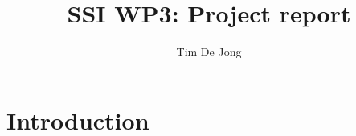 \documentclass{article}
\title{SSI WP3: Project report}
\author{Tim De Jong}
\begin{document}
\maketitle


\section{Introduction}
\end{document}
